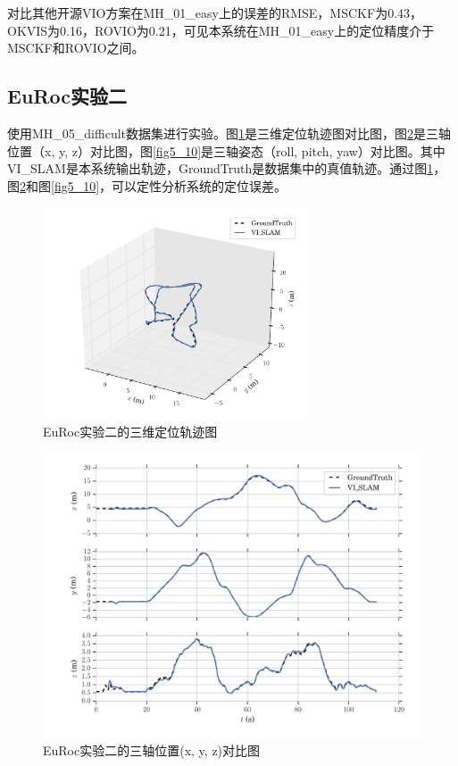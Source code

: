 对比其他开源VIO方案在MH\_01\_easy上的误差的RMSE，MSCKF为0.43，OKVIS为0.16，ROVIO为0.21，可见本系统在MH\_01\_easy上的定位精度介于MSCKF和ROVIO之间。
\subsection{EuRoc实验二}
使用MH\_05\_difficult数据集进行实验。图\ref{fig5_8}是三维定位轨迹图对比图，图\ref{fig5_9}是三轴位置（x, y, z）对比图，图\ref{fig5_10}是三轴姿态（roll, pitch, yaw）对比图。其中VI\_SLAM是本系统输出轨迹，GroundTruth是数据集中的真值轨迹。通过图\ref{fig5_8}，图\ref{fig5_9}和图\ref{fig5_10}，可以定性分析系统的定位误差。
\begin{figure}
	\centering
	\includegraphics[width=0.7\textwidth]{figures/chapter5/traject_mh05}
	\caption{EuRoc实验二的三维定位轨迹图}\label{fig5_8}
\end{figure}
\begin{figure}
	\centering
	\includegraphics[width=1.0\textwidth]{figures/chapter5/xyz_mh05}
	\caption{EuRoc实验二的三轴位置(x, y, z)对比图}\label{fig5_9}
\end{figure}
